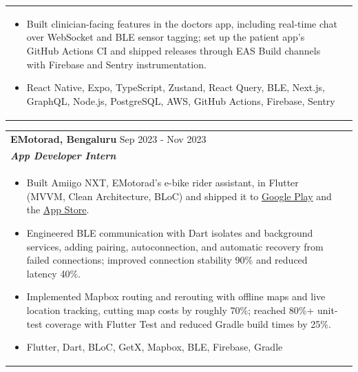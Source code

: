\documentclass[a4paper,8pt]{article}
\begin{document}
\begin{tabularx}{\linewidth}{ @{}l r@{} }
\begin{minipage}[t]{\linewidth}
\begin{itemize}[nosep,after=\strut, leftmargin=2em, itemsep=2pt]
        \item Built clinician-facing features in the doctors app, including real-time chat over WebSocket and BLE sensor tagging; set up the patient app's GitHub Actions CI and shipped releases through EAS Build channels with Firebase and Sentry instrumentation.
        \item React Native, Expo, TypeScript, Zustand, React Query, BLE, Next.js, GraphQL, Node.js, PostgreSQL, AWS, GitHub Actions, Firebase, Sentry
    \end{itemize}
\end{minipage}
\end{tabularx}

\begin{tabularx}{\linewidth}{ @{}l r@{} }
\color[HTML]{1C033C} \textbf{EMotorad, Bengaluru} \hfill \color[HTML]{371e77} Sep 2023 - Nov 2023 \\[4pt]
\color[HTML]{371e77}\textbf{\textit{App Developer Intern}} \hfill \color[HTML]{4B28A4} \\[5pt]
\begin{minipage}[t]{\linewidth}
    \begin{itemize}[nosep,after=\strut, leftmargin=2em, itemsep=2pt]
        \item Built Amiigo NXT, EMotorad's e-bike rider assistant, in Flutter (MVVM, Clean Architecture, BLoC) and shipped it to \href{https://play.google.com/store/apps/details?id=com.emotorad.amigonxt}{Google Play} and the \href{https://apps.apple.com/in/app/amiigo-nxt/id6737222680}{App Store}.
        \item Engineered BLE communication with Dart isolates and background services, adding pairing, autoconnection, and automatic recovery from failed connections; improved connection stability 90\% and reduced latency 40\%.
        \item Implemented Mapbox routing and rerouting with offline maps and live location tracking, cutting map costs by roughly 70\%; reached 80\%+ unit-test coverage with Flutter Test and reduced Gradle build times by 25\%.
        \item Flutter, Dart, BLoC, GetX, Mapbox, BLE, Firebase, Gradle
    \end{itemize}
    \end{minipage}
\end{tabularx}
\end{document}
